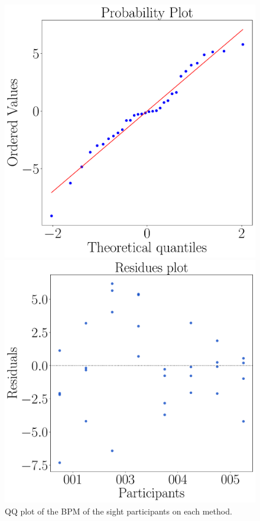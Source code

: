 \begin{figure}[!htb]
    \centering
    \begin{minipage}{0.45\textwidth}
        \centering
        \includegraphics[width = \textwidth]{Resultados/ECG/Figuras/pdf/qqplot_bpm_two_way_sight.pdf}
        \caption{QQ plot of the BPM of the sight participants on each method.}
        \label{fig:qqplot_bpm_two_way_sight}
    \end{minipage}
    \begin{minipage}{0.075\textwidth}
        \hfill
    \end{minipage}
    \begin{minipage}{0.45\textwidth}
        \centering
        \includegraphics[width = \textwidth]{Resultados/ECG/Figuras/pdf/residplot_bpm_two_way_sight.pdf}

\end{minipage}
\end{figure}
